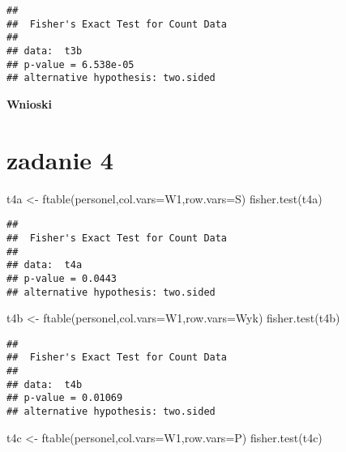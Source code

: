 \documentclass[
]{article}
\newenvironment{Shaded}{\begin{snugshade}}{\end{snugshade}}
\newcommand{\AttributeTok}[1]{\textcolor[rgb]{0.77,0.63,0.00}{#1}}
\newcommand{\FunctionTok}[1]{\textcolor[rgb]{0.00,0.00,0.00}{#1}}
\newcommand{\NormalTok}[1]{#1}
\newcommand{\OtherTok}[1]{\textcolor[rgb]{0.56,0.35,0.01}{#1}}
\newcommand{\StringTok}[1]{\textcolor[rgb]{0.31,0.60,0.02}{#1}}
\begin{document}
\begin{verbatim}
## 
##  Fisher's Exact Test for Count Data
## 
## data:  t3b
## p-value = 6.538e-05
## alternative hypothesis: two.sided
\end{verbatim}

\textbf{Wnioski}

\hypertarget{zadanie-4}{%
\section{zadanie 4}\label{zadanie-4}}

\begin{Shaded}
\begin{Highlighting}[]
\NormalTok{t4a }\OtherTok{\textless{}{-}} \FunctionTok{ftable}\NormalTok{(personel,}\AttributeTok{col.vars=}\StringTok{\textquotesingle{}W1\textquotesingle{}}\NormalTok{,}\AttributeTok{row.vars=}\StringTok{\textquotesingle{}S\textquotesingle{}}\NormalTok{)}
\FunctionTok{fisher.test}\NormalTok{(t4a)}
\end{Highlighting}
\end{Shaded}

\begin{verbatim}
## 
##  Fisher's Exact Test for Count Data
## 
## data:  t4a
## p-value = 0.0443
## alternative hypothesis: two.sided
\end{verbatim}

\begin{Shaded}
\begin{Highlighting}[]
\NormalTok{t4b }\OtherTok{\textless{}{-}} \FunctionTok{ftable}\NormalTok{(personel,}\AttributeTok{col.vars=}\StringTok{\textquotesingle{}W1\textquotesingle{}}\NormalTok{,}\AttributeTok{row.vars=}\StringTok{\textquotesingle{}Wyk\textquotesingle{}}\NormalTok{)}
\FunctionTok{fisher.test}\NormalTok{(t4b)}
\end{Highlighting}
\end{Shaded}

\begin{verbatim}
## 
##  Fisher's Exact Test for Count Data
## 
## data:  t4b
## p-value = 0.01069
## alternative hypothesis: two.sided
\end{verbatim}

\begin{Shaded}
\begin{Highlighting}[]
\NormalTok{t4c }\OtherTok{\textless{}{-}} \FunctionTok{ftable}\NormalTok{(personel,}\AttributeTok{col.vars=}\StringTok{\textquotesingle{}W1\textquotesingle{}}\NormalTok{,}\AttributeTok{row.vars=}\StringTok{\textquotesingle{}P\textquotesingle{}}\NormalTok{)}
\FunctionTok{fisher.test}\NormalTok{(t4c)}
\end{Highlighting}
\end{Shaded}
\end{document}
